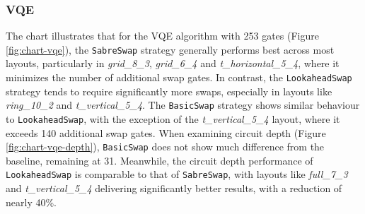 \subsubsection{VQE}
The chart illustrates that for the VQE algorithm with 253 gates (Figure \ref{fig:chart-vqe}), the \lstinline{SabreSwap} strategy generally performs best across most layouts, particularly in \textit{grid\_8\_3}, \textit{grid\_6\_4} and \textit{t\_horizontal\_5\_4}, where it minimizes the number of additional swap gates. In contrast, the \lstinline{LookaheadSwap} strategy tends to require significantly more swaps, especially in layouts like \textit{ring\_10\_2} and \textit{t\_vertical\_5\_4}. The \lstinline{BasicSwap} strategy shows similar behaviour to \lstinline{LookaheadSwap}, with the exception of the \textit{t\_vertical\_5\_4} layout, where it exceeds 140 additional swap gates. When examining circuit depth (Figure \ref{fig:chart-vqe-depth}), \lstinline{BasicSwap} does not show much difference from the baseline, remaining at 31. Meanwhile, the circuit depth performance of \lstinline{LookaheadSwap} is comparable to that of \lstinline{SabreSwap}, with layouts like \textit{full\_7\_3} and \textit{t\_vertical\_5\_4} delivering significantly better results, with a reduction of nearly 40\%.
